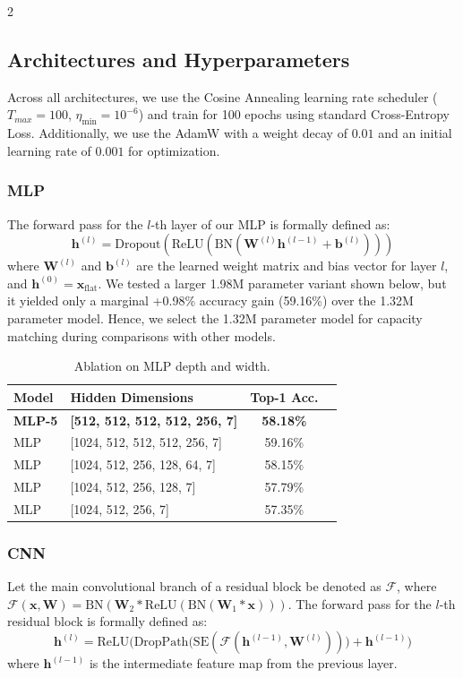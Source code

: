 \documentclass[a4paper,10pt]{article}
\begin{document}
\begin{multicols*}{2}
\subsection{Architectures and Hyperparameters}
\label{architectures_and_hyperparameters}
Across all architectures, we use the Cosine Annealing learning rate scheduler \cite{loshchilov2016sgdr} ($T_{max} = 100$, $\eta_{\text{min}} = 10^{-6}$) and train for 100 epochs using standard Cross-Entropy Loss. Additionally, we use the AdamW \cite{loshchilov2017decoupled} with a weight decay of $0.01$ and an initial learning rate of $0.001$ for optimization.

\subsubsection{MLP}
\label{mlp_details}
The forward pass for the $l$-th layer of our MLP is formally defined as:
$$\mathbf{h}^{(l)} = \text{Dropout}(\text{ReLU}(\text{BN}(\mathbf{W}^{(l)}\mathbf{h}^{(l-1)} + \mathbf{b}^{(l)})))$$
where $\mathbf{W}^{(l)}$ and $\mathbf{b}^{(l)}$ are the learned weight matrix and bias vector for layer $l$, and $\mathbf{h}^{(0)} = \mathbf{x}_{\text{flat}}$. We tested a larger 1.98M parameter variant shown below, but it yielded only a marginal +0.98\% accuracy gain (59.16\%) over the 1.32M parameter model. Hence, we select the 1.32M parameter model for capacity matching during comparisons with other models.
\begin{table}[H]
\centering
\caption{Ablation on MLP depth and width.}
\label{tab:mlp_ablations}
\begin{tabular}{@{}llcc@{}}
\toprule
\textbf{Model} & \textbf{Hidden Dimensions}  & \textbf{Top-1 Acc.} \\ \midrule
\textbf{MLP-5} & \textbf{[512, 512, 512, 512, 256, 7]} & \textbf{58.18\%} \\ \midrule
MLP & [1024, 512, 512, 512, 256, 7]  & 59.16\% \\
MLP & [1024, 512, 256, 128, 64, 7]  & 58.15\% \\
MLP & [1024, 512, 256, 128, 7] & 57.79\% \\
MLP & [1024, 512, 256, 7]  & 57.35\% \\ \bottomrule
\end{tabular}
\end{table}

\subsubsection{CNN}
\label{cnn_details}
Let the main convolutional branch of a residual block be denoted as $\mathcal{F}$, where $\mathcal{F}(\mathbf{x}, \mathbf{W}) = \text{BN}(\mathbf{W}_2 * \text{ReLU}(\text{BN}(\mathbf{W}_1 * \mathbf{x})))$. The forward pass for the $l$-th residual block is formally defined as:$$\mathbf{h}^{(l)} = \text{ReLU}\Big( \text{DropPath}\big(\text{SE}(\mathcal{F}(\mathbf{h}^{(l-1)}, \mathbf{W}^{(l)}))\big) + \mathbf{h}^{(l-1)} \Big)$$where $\mathbf{h}^{(l-1)}$ is the intermediate feature map from the previous layer.


\end{multicols*}
\end{document}
